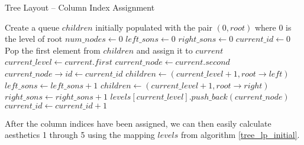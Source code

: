 \documentclass[11pt]{report}
\begin{document}
\begin{algorithm}[H]
    \caption{Tree Layout -- Column Index Assignment}
    \label{tree_lp_initial}
    \begin{algorithmic}[1]
        \State Create a queue $children$ initially populated with the pair $(0, root)$ where 0 is the level of root
        \State $num\_nodes \gets 0$ 
        \State $left\_sons \gets 0$
        \State $right\_sons \gets 0$
        \State $current\_id \gets 0$ 
         
        \State Pop the first element from $children$ and assign it to $current$
        \State $current\_level \gets current.first$
        \State $current\_node \gets current.second$
        \State $current\_node\rightarrow id \gets current\_id$
            \State $children \gets (current\_level + 1, root\rightarrow left)$
            \State $left\_sons \gets left\_sons + 1$ 
            \EndIf
            \State $children \gets (current\_level + 1, root\rightarrow right)$
            \State $right\_sons \gets right\_sons + 1$ 
            \EndIf
        \State $levels[current\_level].push\_back(current\_node)$
        \State $current\_id \gets current\_id + 1$
        \EndWhile
        \EndProcedure
    \end{algorithmic}
\end{algorithm}

After the column indices have been assigned, we can then easily calculate aesthetics 1 through 5 using the mapping $levels$ from algorithm \ref{tree_lp_initial}.
\end{document}
